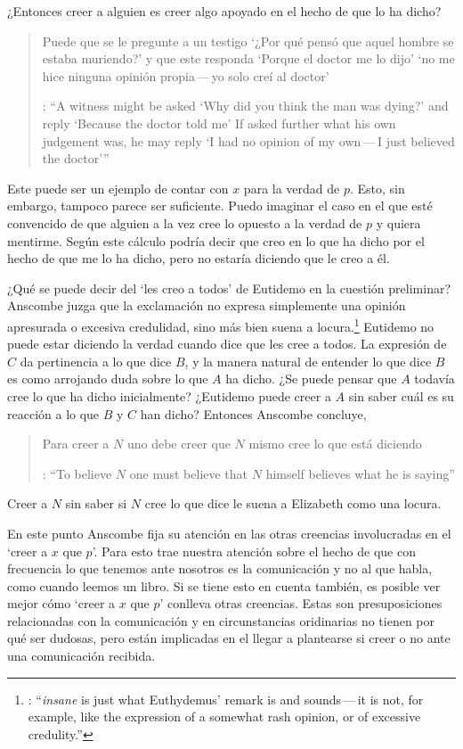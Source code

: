 ¿Entonces creer a alguien es creer algo apoyado en el hecho de que lo ha dicho? \blockquote[{\cite[4]{anscombe2008faith:tobelieve}}: \enquote{A witness might be asked `Why did you think the man was dying?' and reply `Because the doctor told me' \textelp{} If asked further what his own judgement was, he may reply `I had no opinion of my own\,---\,I just believed the doctor'}]{Puede que se le pregunte a un testigo `¿Por qué pensó que aquel hombre se estaba muriendo?' y que este responda `Porque el doctor me lo dijo' \textelp{} `no me hice ninguna opinión propia\,---\,yo solo creí al doctor'}. Este puede ser un ejemplo de contar con $x$ para la verdad de $p$. Esto, sin embargo, tampoco parece ser suficiente. Puedo imaginar el caso en el que esté convencido de que alguien a la vez cree lo opuesto a la verdad de $p$ y quiera mentirme. Según este cálculo podría decir que creo en lo que ha dicho por el hecho de que me lo ha dicho, pero no estaría diciendo que le creo a él.

¿Qué se puede decir del \enquote*{les creo a todos} de Eutidemo en la cuestión preliminar? Anscombe juzga que la exclamación no expresa simplemente una opinión apresurada o excesiva credulidad, sino más bien suena a locura.\footnote{\cite[Cf.~][5]{anscombe2008faith:tobelieve}: \enquote{\emph{insane} is just what Euthydemus' remark is and sounds\,---\,it is not, for example, like the expression of a somewhat rash opinion, or of excessive credulity.}} Eutidemo no puede estar diciendo la verdad cuando dice que les cree a todos. La expresión de $C$ da pertinencia a lo que dice $B$, y la manera natural de entender lo que dice $B$ es como arrojando duda sobre lo que $A$ ha dicho. ¿Se puede pensar que $A$ todavía cree lo que ha dicho inicialmente? ¿Eutidemo puede creer a $A$ sin saber cuál es su reacción a lo que $B$ y $C$ han dicho? Entonces Anscombe concluye, \blockquote[{\cite[5]{anscombe2008faith:tobelieve}}: \enquote{To believe $N$ one must believe that $N$ himself believes what he is saying}]{Para creer a $N$ uno debe creer que $N$ mismo cree lo que está diciendo}. Creer a $N$ sin saber si $N$ cree lo que dice le suena a Elizabeth como una locura.

En este punto Anscombe fija su atención en las otras creencias involucradas en el `creer a $x$ que $p$'. Para esto trae nuestra atención sobre el hecho de que con frecuencia lo que tenemos ante nosotros es la comunicación y no al que habla, como cuando leemos un libro. Si se tiene esto en cuenta también, es posible ver mejor cómo `creer a $x$ que $p$' conlleva otras creencias. Estas son presuposiciones relacionadas con la comunicación y en circunstancias oridinarias no tienen por qué ser dudosas, pero están implicadas en el llegar a plantearse si creer o no ante una comunicación recibida.

